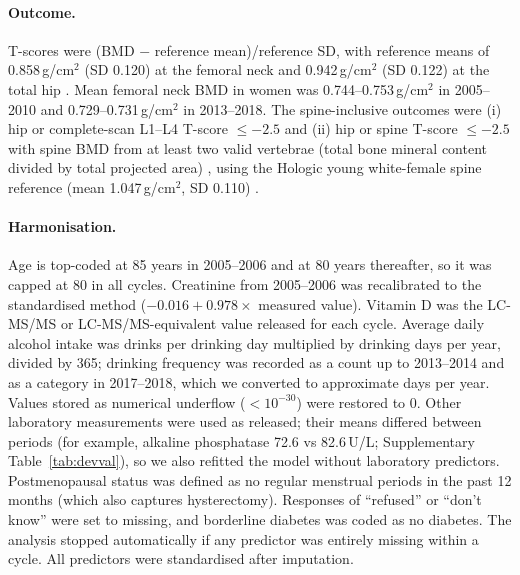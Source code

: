 \documentclass[11pt,a4paper]{article}
\begin{document}
\paragraph{Outcome.} T-scores were (BMD $-$ reference mean)/reference SD, with reference means of 0.858\,g/cm$^2$ (SD 0.120) at the femoral neck and 0.942\,g/cm$^2$ (SD 0.122) at the total hip \cite{looker1998}. Mean femoral neck BMD in women was 0.744--0.753\,g/cm$^2$ in 2005--2010 and 0.729--0.731\,g/cm$^2$ in 2013--2018. The spine-inclusive outcomes were (i) hip or complete-scan L1--L4 T-score $\le -2.5$ and (ii) hip or spine T-score $\le -2.5$ with spine BMD from at least two valid vertebrae (total bone mineral content divided by total projected area) \cite{baim2008}, using the Hologic young white-female spine reference (mean 1.047\,g/cm$^2$, SD 0.110) \cite{sarafrazi2021,wright2014}.

\paragraph{Harmonisation.} Age is top-coded at 85 years in 2005--2006 and at 80 years thereafter, so it was capped at 80 in all cycles. Creatinine from 2005--2006 was recalibrated to the standardised method ($-0.016 + 0.978\times$ measured value). Vitamin D was the LC-MS/MS or LC-MS/MS-equivalent value released for each cycle. Average daily alcohol intake was drinks per drinking day multiplied by drinking days per year, divided by 365; drinking frequency was recorded as a count up to 2013--2014 and as a category in 2017--2018, which we converted to approximate days per year. Values stored as numerical underflow ($<10^{-30}$) were restored to 0. Other laboratory measurements were used as released; their means differed between periods (for example, alkaline phosphatase 72.6 vs 82.6\,U/L; Supplementary Table~\ref{tab:devval}), so we also refitted the model without laboratory predictors. Postmenopausal status was defined as no regular menstrual periods in the past 12 months (which also captures hysterectomy). Responses of ``refused'' or ``don't know'' were set to missing, and borderline diabetes was coded as no diabetes. The analysis stopped automatically if any predictor was entirely missing within a cycle. All predictors were standardised after imputation.
\end{document}
